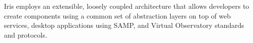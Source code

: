 Iris employs an extensible, loosely coupled architecture that allows developers to create components using a common set of abstraction layers on top of web services, desktop applications using SAMP, and Virtual Observatory standards and protocols.